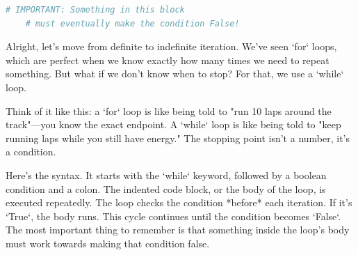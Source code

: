 \documentclass{beamer}
\begin{document}
\begin{frame}[fragile]
\begin{lstlisting}[language=Python]
    # IMPORTANT: Something in this block
    # must eventually make the condition False!
    \end{lstlisting}
    
    \begin{note}
    Alright, let's move from definite to indefinite iteration. We've seen `for` loops, which are perfect when we know exactly how many times we need to repeat something. But what if we don't know when to stop? For that, we use a `while` loop.

    Think of it like this: a `for` loop is like being told to "run 10 laps around the track"—you know the exact endpoint. A `while` loop is like being told to "keep running laps while you still have energy." The stopping point isn't a number, it's a condition.

    Here's the syntax. It starts with the `while` keyword, followed by a boolean condition and a colon. The indented code block, or the body of the loop, is executed repeatedly. The loop checks the condition *before* each iteration. If it's `True`, the body runs. This cycle continues until the condition becomes `False`. The most important thing to remember is that something inside the loop's body must work towards making that condition false.
    \end{note}
\end{frame}
\end{document}
